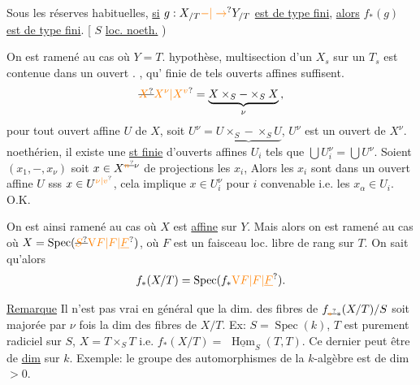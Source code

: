 Sous les réserves habituelles, \uline{si} $g:X_{/T}\unsure{\mathbin{-}|\to}Y_{/T}$ \uline{est de
type fini}, \uline{alors} $f_\ast(g)$ \uline{est de type fini}.
[ $S$  \uline{loc. noeth.} )

On est ramené au cas où $Y=T$.  
hypothèse,  multisection d'un
$X_s$ sur un $T_s$ est contenue dans un ouvert .
, qu' finie de tels ouverts
affines  suffisent.  
\[
\deleted{\unsure{X}}\unsure{X^{\nu}|X^{v}}=
\underbrace{X\times_S\mathbin{-}\times_S X}_{\nu}\,,
\]
pour tout ouvert affine
$U$ de $X$, soit $U^\nu=\underbrace{U\times_S\mathbin{-}\times_S U}$, $U^\nu$ est un
ouvert de $X^\nu$.  
noethérien, il existe une \uline{st finie} d'ouverts
affines $U_i$ tels que $\bigcup U_i^\nu=\bigcup U^\nu$.
Soient $(x_1,\mathbin{-},x_\nu)$ soit $x\in X^{\deleted{\unsure{n}}\nu}$ de projections les $x_i$,
Alors les $x_i$ sont dans un ouvert affine
$U$ sss $x\in U^{\unsure{\nu|v}}$,  cela implique
$x\in U_i^\nu$ pour $i$ convenable i.e. les $x_\alpha\in U_i$.
O.K.

On est ainsi ramené au cas où $X$
est \uline{affine} sur $Y$. Mais alors on est
\unsure{=} ramené au cas où $X=\operatorname{Spec}(\deleted{\unsure{S}}\unsure{\mathrm V F|F|\underline F})$, où
$F$ est un faisceau loc. libre de rang 
sur $T$. On sait qu'alors
\[
f_\ast(X/T)=\operatorname{Spec}(f_\ast \unsure{\mathrm V F|F|\underline F}).
\]


\uline{Remarque} Il n'est pas vrai en général que
la dim. des fibres de $f_{\deleted{\unsure{\ast}}\ast}(X/T)/S$
soit majorée par $\nu$ fois la dim
des fibres de  $X/T$. Ex:
$S=\operatorname{Spec}(k)$, $T$ est purement
radiciel sur $S$, $X=T\times_S T$ i.e. $f_\ast(X/T)=$
$\underline{\operatorname{Hom}}_S(T,T)$. Ce dernier peut être de
\uline{dim}  sur $k$. Exemple: le groupe des
automorphismes de la $k$-algèbre  est
de dim $>0$.


